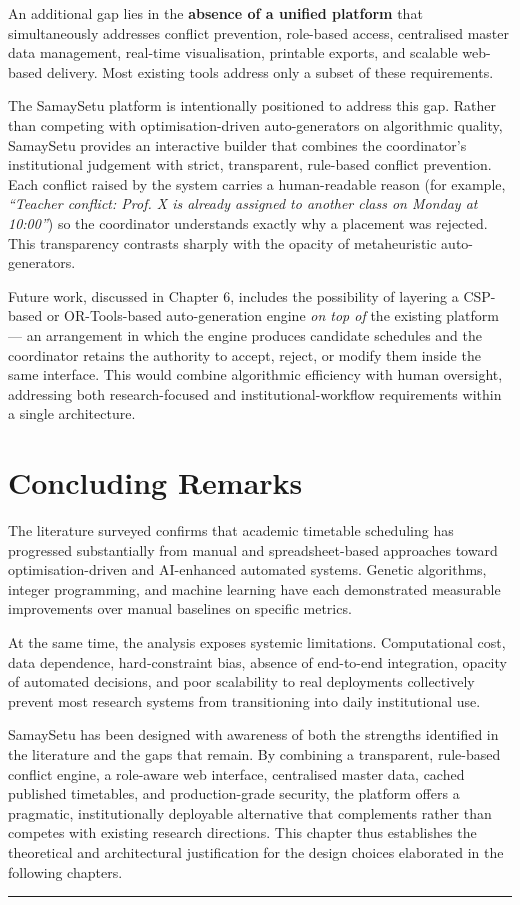 An additional gap lies in the \textbf{absence of a unified platform} that simultaneously addresses conflict prevention, role-based access, centralised master data management, real-time visualisation, printable exports, and scalable web-based delivery. Most existing tools address only a subset of these requirements.

The SamaySetu platform is intentionally positioned to address this gap. Rather than competing with optimisation-driven auto-generators on algorithmic quality, SamaySetu provides an interactive builder that combines the coordinator's institutional judgement with strict, transparent, rule-based conflict prevention. Each conflict raised by the system carries a human-readable reason (for example, \textit{``Teacher conflict: Prof. X is already assigned to another class on Monday at 10:00''}) so the coordinator understands exactly why a placement was rejected. This transparency contrasts sharply with the opacity of metaheuristic auto-generators.

Future work, discussed in Chapter 6, includes the possibility of layering a CSP-based or OR-Tools-based auto-generation engine \textit{on top of} the existing platform --- an arrangement in which the engine produces candidate schedules and the coordinator retains the authority to accept, reject, or modify them inside the same interface. This would combine algorithmic efficiency with human oversight, addressing both research-focused and institutional-workflow requirements within a single architecture.

\section{Concluding Remarks}

The literature surveyed confirms that academic timetable scheduling has progressed substantially from manual and spreadsheet-based approaches toward optimisation-driven and AI-enhanced automated systems. Genetic algorithms, integer programming, and machine learning have each demonstrated measurable improvements over manual baselines on specific metrics.

At the same time, the analysis exposes systemic limitations. Computational cost, data dependence, hard-constraint bias, absence of end-to-end integration, opacity of automated decisions, and poor scalability to real deployments collectively prevent most research systems from transitioning into daily institutional use.

SamaySetu has been designed with awareness of both the strengths identified in the literature and the gaps that remain. By combining a transparent, rule-based conflict engine, a role-aware web interface, centralised master data, cached published timetables, and production-grade security, the platform offers a pragmatic, institutionally deployable alternative that complements rather than competes with existing research directions. This chapter thus establishes the theoretical and architectural justification for the design choices elaborated in the following chapters.

\vspace{10mm}
\hrule
